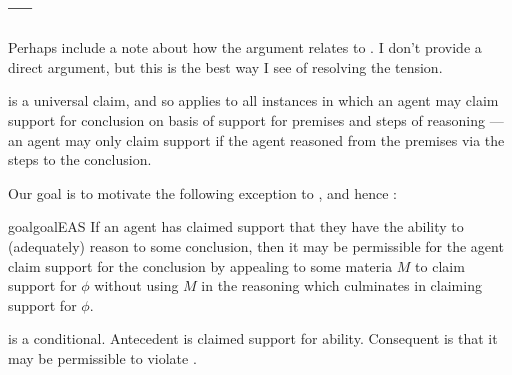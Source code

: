 \subsection{\EAS{} --- \EAS{-}}
\label{sec:eas}

{
  \color{red}
  Perhaps include a note about how the argument relates to \EAS{}.
  I don't provide a direct argument, but this is the best way I see of resolving the tension.
}

\begin{note}[Alternative]
  \ESU{} is a universal claim, and so applies to all instances in which an agent may claim support for conclusion on basis of support for premises and steps of reasoning --- an agent may only claim support if the agent reasoned from the premises via the steps to the conclusion.

  Our goal is to motivate the following exception to \gESU{}, and hence \ESU{}:

  \begin{restatable}[\EAS{-} --- \EAS{}]{goal}{goalEAS}\label{prop:EAS}
    If an agent has claimed support that they have the ability to (adequately) reason to some conclusion, then it may be permissible for the agent claim support for the conclusion by appealing to some materia \(M\) to claim support for \(\phi\) without using \(M\) in the reasoning which culminates in claiming support for \(\phi\).
  \end{restatable}
\end{note}

\begin{note}
  \EAS{} is a conditional.
  Antecedent is claimed support for ability.
  Consequent is that it may be permissible to violate \gESU{}.
\end{note}

